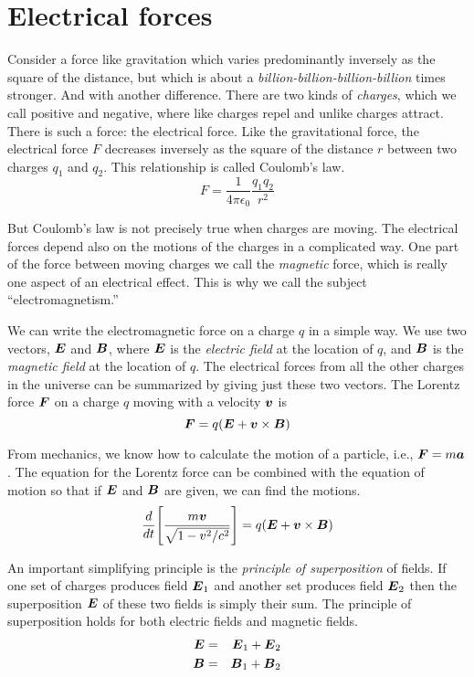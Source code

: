 \section{Electrical forces}

Consider a force like gravitation which varies 
predominantly inversely as the square of the distance, but which is 
about a \emph{billion-billion-billion-billion} times stronger.
And with another difference.  There are two kinds of \emph{charges},
which we call positive and negative, where like charges repel and unlike charges attract.
There is such a force: the electrical force.
Like the gravitational force, the electrical force $F$ decreases inversely
as the square of the distance $r$ between two charges $q_1$ and $q_2$.
This relationship is called Coulomb's law.
\begin{equation*}
  F = \frac{1}{4 \pi \epsilon_0} \frac{q_1 q_2}{r^2}
\end{equation*}

But Coulomb's law is not precisely true when charges are moving.
The electrical forces depend also on the motions of the charges in a complicated way.
One part of the force between moving charges we call the \emph{magnetic} force,
which is really one aspect of an electrical effect.
This is why we call the subject ``electromagnetism.''

We can write the electromagnetic force on a charge $q$ in a simple way.
We use two vectors, $\boldsymbol{E}$ and $\boldsymbol{B}$, 
where $\boldsymbol{E}$ is the \emph{electric field} at the location of $q$,
and $\boldsymbol{B}$ is the \emph{magnetic field} at the location of $q$.
The electrical forces from all the other charges in the universe
can be summarized by giving just these two vectors.
The Lorentz force $\boldsymbol{F}$ on a charge $q$ moving with a velocity $\boldsymbol{v}$ is
\begin{equation}
  \boldsymbol{F} = q(\boldsymbol{E} + \boldsymbol{v} \times \boldsymbol{B})
\end{equation}

\newpage

From mechanics, we know how to calculate the motion of a particle, i.e., $\boldsymbol{F} = m \boldsymbol{a}$.
The equation for the Lorentz force can be combined with the equation of motion so that
if $\boldsymbol{E}$ and $\boldsymbol{B}$ are given, we can find the motions.
\begin{equation}
  \frac{d}{dt} \Bigg[ \frac{m \boldsymbol{v}}{\sqrt{1 - v^2 / c^2}} \Bigg]
  = q(\boldsymbol{E} + \boldsymbol{v} \times \boldsymbol{B})
\end{equation}

An important simplifying principle is the \emph{principle of superposition} of fields.
If one set of charges produces field $\boldsymbol{E}_1$ and another set produces field $\boldsymbol{E}_2$
then the superposition $\boldsymbol{E}$ of these two fields is simply their sum.
The principle of superposition holds for both electric fields and magnetic fields.
\begin{eqnarray}
  \boldsymbol{E} &=& \boldsymbol{E}_1 + \boldsymbol{E}_2 \\
  \boldsymbol{B} &=& \boldsymbol{B}_1 + \boldsymbol{B}_2 \nonumber
\end{eqnarray}

